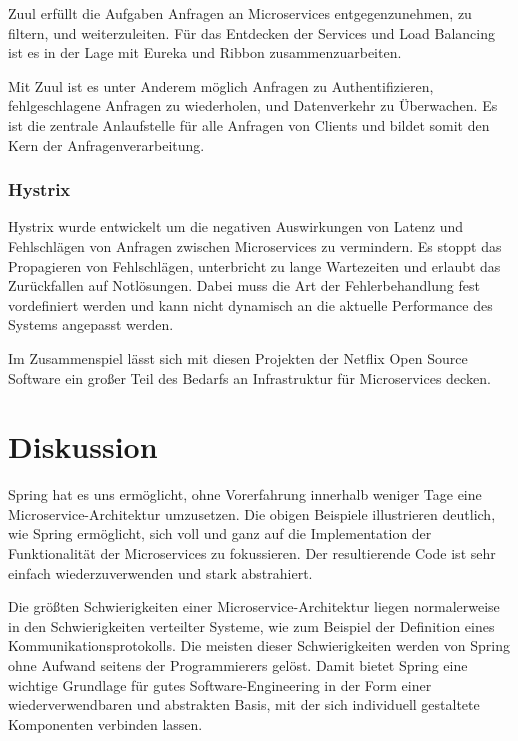 \documentclass{article}
\begin{document}
Zuul erfüllt die Aufgaben Anfragen an Microservices entgegenzunehmen, zu filtern, und weiterzuleiten.
Für das Entdecken der Services und Load Balancing ist es in der Lage mit Eureka und Ribbon zusammenzuarbeiten.

Mit Zuul ist es unter Anderem möglich Anfragen zu Authentifizieren, fehlgeschlagene Anfragen zu wiederholen, und Datenverkehr zu Überwachen.
Es ist die zentrale Anlaufstelle für alle Anfragen von Clients und bildet somit den Kern der Anfragenverarbeitung.

\subsubsection{Hystrix}

Hystrix wurde entwickelt um die negativen Auswirkungen von Latenz und Fehlschlägen von Anfragen zwischen Microservices zu vermindern.
Es stoppt das Propagieren von Fehlschlägen, unterbricht zu lange Wartezeiten und erlaubt das Zurückfallen auf Notlösungen.
Dabei muss die Art der Fehlerbehandlung fest vordefiniert werden und kann nicht dynamisch an die aktuelle Performance des Systems angepasst werden.\medskip

Im Zusammenspiel lässt sich mit diesen Projekten der Netflix Open Source Software ein großer Teil des Bedarfs an Infrastruktur für Microservices decken.

\section{Diskussion}

Spring hat es uns ermöglicht, ohne Vorerfahrung innerhalb weniger Tage eine Microservice-Architektur umzusetzen.
Die obigen Beispiele illustrieren deutlich, wie Spring ermöglicht, sich voll und ganz auf die Implementation der Funktionalität der Microservices zu fokussieren.
Der resultierende Code ist sehr einfach wiederzuverwenden und stark abstrahiert.

Die größten Schwierigkeiten einer Microservice-Architektur liegen normalerweise in den Schwierigkeiten verteilter Systeme, wie zum Beispiel der Definition eines Kommunikationsprotokolls.
Die meisten dieser Schwierigkeiten werden von Spring ohne Aufwand seitens der Programmierers gelöst.
Damit bietet Spring eine wichtige Grundlage für gutes Software-Engineering in der Form einer wiederverwendbaren und abstrakten Basis, mit der sich individuell gestaltete Komponenten verbinden lassen.
\end{document}

